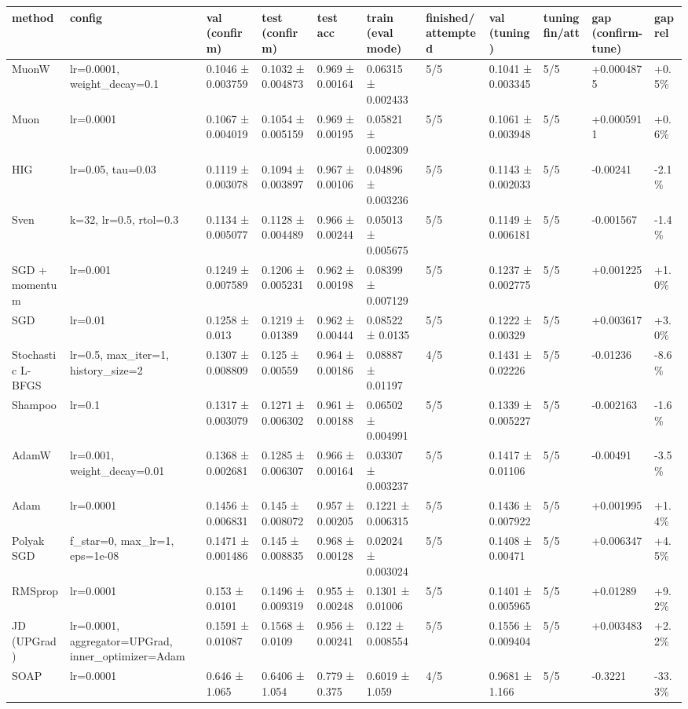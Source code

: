 \begin{tabular}{lllllllllll}
\toprule
method & config & val (confirm) & test (confirm) & test acc & train (eval mode) & finished/attempted & val (tuning) & tuning fin/att & gap (confirm-tune) & gap rel \\
\midrule
MuonW & lr=0.0001, weight\_decay=0.1 & 0.1046 ± 0.003759 & 0.1032 ± 0.004873 & 0.969 ± 0.00164 & 0.06315 ± 0.002433 & 5/5 & 0.1041 ± 0.003345 & 5/5 & +0.0004875 & +0.5\% \\
Muon & lr=0.0001 & 0.1067 ± 0.004019 & 0.1054 ± 0.005159 & 0.969 ± 0.00195 & 0.05821 ± 0.002309 & 5/5 & 0.1061 ± 0.003948 & 5/5 & +0.0005911 & +0.6\% \\
HIG & lr=0.05, tau=0.03 & 0.1119 ± 0.003078 & 0.1094 ± 0.003897 & 0.967 ± 0.00106 & 0.04896 ± 0.003236 & 5/5 & 0.1143 ± 0.002033 & 5/5 & -0.00241 & -2.1\% \\
Sven & k=32, lr=0.5, rtol=0.3 & 0.1134 ± 0.005077 & 0.1128 ± 0.004489 & 0.966 ± 0.00244 & 0.05013 ± 0.005675 & 5/5 & 0.1149 ± 0.006181 & 5/5 & -0.001567 & -1.4\% \\
SGD + momentum & lr=0.001 & 0.1249 ± 0.007589 & 0.1206 ± 0.005231 & 0.962 ± 0.00198 & 0.08399 ± 0.007129 & 5/5 & 0.1237 ± 0.002775 & 5/5 & +0.001225 & +1.0\% \\
SGD & lr=0.01 & 0.1258 ± 0.013 & 0.1219 ± 0.01389 & 0.962 ± 0.00444 & 0.08522 ± 0.0135 & 5/5 & 0.1222 ± 0.00329 & 5/5 & +0.003617 & +3.0\% \\
Stochastic L-BFGS & lr=0.5, max\_iter=1, history\_size=2 & 0.1307 ± 0.008809 & 0.125 ± 0.00559 & 0.964 ± 0.00186 & 0.08887 ± 0.01197 & 4/5 & 0.1431 ± 0.02226 & 5/5 & -0.01236 & -8.6\% \\
Shampoo & lr=0.1 & 0.1317 ± 0.003079 & 0.1271 ± 0.006302 & 0.961 ± 0.00188 & 0.06502 ± 0.004991 & 5/5 & 0.1339 ± 0.005227 & 5/5 & -0.002163 & -1.6\% \\
AdamW & lr=0.001, weight\_decay=0.01 & 0.1368 ± 0.002681 & 0.1285 ± 0.006307 & 0.966 ± 0.00164 & 0.03307 ± 0.003237 & 5/5 & 0.1417 ± 0.01106 & 5/5 & -0.00491 & -3.5\% \\
Adam & lr=0.0001 & 0.1456 ± 0.006831 & 0.145 ± 0.008072 & 0.957 ± 0.00205 & 0.1221 ± 0.006315 & 5/5 & 0.1436 ± 0.007922 & 5/5 & +0.001995 & +1.4\% \\
Polyak SGD & f\_star=0, max\_lr=1, eps=1e-08 & 0.1471 ± 0.001486 & 0.145 ± 0.008835 & 0.968 ± 0.00128 & 0.02024 ± 0.003024 & 5/5 & 0.1408 ± 0.00471 & 5/5 & +0.006347 & +4.5\% \\
RMSprop & lr=0.0001 & 0.153 ± 0.0101 & 0.1496 ± 0.009319 & 0.955 ± 0.00248 & 0.1301 ± 0.01006 & 5/5 & 0.1401 ± 0.005965 & 5/5 & +0.01289 & +9.2\% \\
JD (UPGrad) & lr=0.0001, aggregator=UPGrad, inner\_optimizer=Adam & 0.1591 ± 0.01087 & 0.1568 ± 0.0109 & 0.956 ± 0.00241 & 0.122 ± 0.008554 & 5/5 & 0.1556 ± 0.009404 & 5/5 & +0.003483 & +2.2\% \\
SOAP & lr=0.0001 & 0.646 ± 1.065 & 0.6406 ± 1.054 & 0.779 ± 0.375 & 0.6019 ± 1.059 & 4/5 & 0.9681 ± 1.166 & 5/5 & -0.3221 & -33.3\% \\
\bottomrule
\end{tabular}

